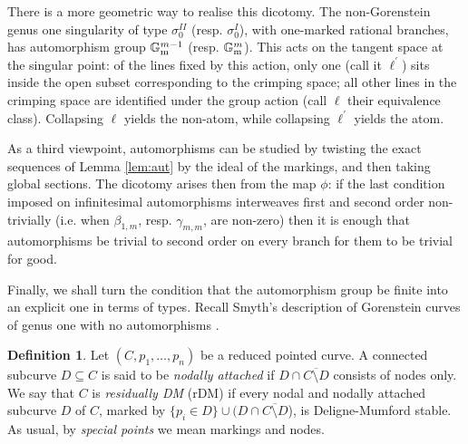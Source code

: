 \documentclass[11pt]{amsart}
\newcommand{\Gm}{\mathbb{G}_{\rm{m}}}
\theoremstyle{plain}
\theoremstyle{definition}
\newtheorem{dfn}[thm]{Definition}
\begin{document}
There is a more geometric way to realise this dicotomy. The non-Gorenstein genus one singularity of type $\sigma_0^{I\!I}$ (resp. $\sigma_0^{I}$), with one-marked rational branches, has automorphism group $\Gm^{m-1}$ (resp. $\Gm^m$). This acts on the tangent space at the singular point: of the lines fixed by this action, only one (call it $\ell^\prime$) sits inside the open subset corresponding to the crimping space; all other lines in the crimping space are identified under the group action (call $\ell$ their equivalence class). Collapsing $\ell$ yields the non-atom, while collapsing $\ell^\prime$ yields the atom.

As a third viewpoint, automorphisms can be studied by twisting the exact sequences of Lemma \ref{lem:aut} by the ideal of the markings, and then taking global sections. The dicotomy arises then from the map $\phi$: if the last condition imposed on infinitesimal automorphisms interweaves first and second order non-trivially (i.e. when $\beta_{1,m}$, resp. $\gamma_{m,m}$, are non-zero) then it is enough that automorphisms be trivial to second order on every branch for them to be trivial for good.

\smallskip

Finally, we shall turn the condition that the automorphism group be finite into an explicit one in terms of types. Recall Smyth's description of Gorenstein curves of genus one with no automorphisms \cite[Proposition 2.3, Corollary 2.4]{SMY1}.

\begin{dfn}
 Let $(C,p_1,\ldots,p_n)$ be a reduced pointed curve. A connected subcurve $D\subseteq C$ is said to be \emph{nodally attached} if $D\cap\overline{C\setminus D}$ consists of nodes only.
  We say that $C$ is \emph{residually DM} (rDM) if every nodal and nodally attached subcurve $D$ of $C$, marked by $\{p_i\in D\}\cup (D\cap\overline{C\setminus D}$), is Deligne-Mumford stable. As usual, by \emph{special points} we mean markings and nodes.
\end{dfn}
\end{document}
